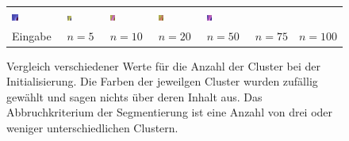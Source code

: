 \begin{figure}[h!]
\begin{tabular}{C{0.14\textwidth}C{0.14\textwidth}C{0.14\textwidth}C{0.14\textwidth}C{0.14\textwidth}C{0.14\textwidth}C{0.14\textwidth}}
		\includegraphics[width=0.14\textwidth]{images/gen/number_of_segments/p03_04.png_10.png} &
		\includegraphics[width=0.14\textwidth]{images/gen/number_of_segments/p03_04.png_20.png} &
		\includegraphics[width=0.14\textwidth]{images/gen/number_of_segments/p03_04.png_50.png} &
		\includegraphics[width=0.14\textwidth]{images/gen/number_of_segments/p03_04.png_75.png} &
		\includegraphics[width=0.14\textwidth]{images/gen/number_of_segments/p03_04.png_100.png} \\
		
		\hspace{2pt}\newline\centering Eingabe & 
		\hspace{2pt}\newline\centering $n=5$ &
		\hspace{2pt}\newline\centering $n=10$ &
		\hspace{2pt}\newline\centering $n=20$ &
		\hspace{2pt}\newline\centering $n=50$ &
		\hspace{2pt}\newline\centering $n=75$ &
		\hspace{2pt}\newline\centering $n=100$
	\end{tabular}
	\caption{Vergleich verschiedener Werte für die Anzahl der Cluster bei der Initialisierung. Die Farben der jeweilgen Cluster wurden zufällig gewählt und sagen nichts über deren Inhalt aus. Das Abbruchkriterium der Segmentierung ist eine Anzahl von drei oder weniger unterschiedlichen Clustern.}
	\label{fig:n_segments}
\end{figure}

